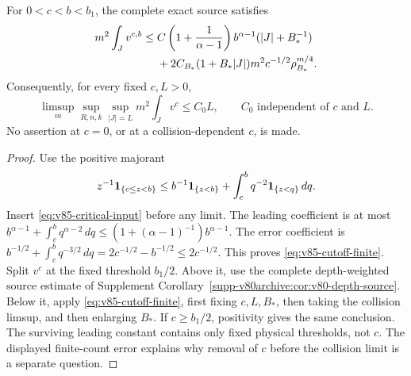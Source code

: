 \begin{proposition}
\label{prop:v85-cutoff}
For $0<c<b<b_1$, the complete exact source satisfies
\begin{align}
 m^2\int_Jv^{c,b}
 \le{}&C\left(1+\frac1{\alpha-1}\right)b^{\alpha-1}
                                      (|J|+B_*^{-1})\notag\\
 &+2C_{B_*}(1+B_*|J|)m^2c^{-1/2}\rho_{B_*}^{m/4}.
                                             \label{eq:v85-cutoff-finite}
\end{align}
Consequently, for every fixed $c,L>0$,
\begin{equation}\label{eq:v85-cutoff-uniform}
 \limsup_m\sup_{R,n,k}\sup_{|J|=L}m^2\int_Jv^c\le C_0 L,
 \qquad C_0\text{ independent of }c\text{ and }L.
\end{equation}
No assertion at $c=0$, or at a collision-dependent $c$, is made.
\end{proposition}
\begin{proof}
Use the positive majorant
\[
 z^{-1}\mathbf1_{\{c\le z<b\}}
 \le b^{-1}\mathbf1_{\{z<b\}}+\int_c^b q^{-2}\mathbf1_{\{z<q\}}\,dq.
\]
Insert \eqref{eq:v85-critical-input} before any limit. The leading
coefficient is at most
$b^{\alpha-1}+\int_c^b q^{\alpha-2}\,dq
\le(1+(\alpha-1)^{-1})b^{\alpha-1}$.
The error coefficient is
$b^{-1/2}+\int_c^b q^{-3/2}\,dq
=2c^{-1/2}-b^{-1/2}\le2c^{-1/2}$.
This proves \eqref{eq:v85-cutoff-finite}. Split $v^c$ at the fixed
threshold $b_1/2$. Above it, use the complete depth-weighted source
estimate of Supplement Corollary~\ref{supp-v80archive:cor:v80-depth-source}.
Below it, apply \eqref{eq:v85-cutoff-finite}, first fixing $c,L,B_*$,
then taking the collision limsup, and then enlarging $B_*$. If
$c\ge b_1/2$, positivity gives the same conclusion. The surviving
leading constant contains only fixed physical thresholds, not $c$.
The displayed finite-count error explains why removal of $c$ before
the collision limit is a separate question.
\end{proof}

